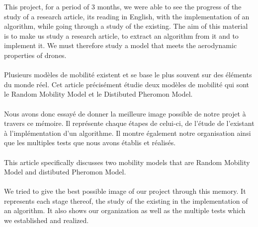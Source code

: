 This project, for a period of 3 months, we were able to see the progress of the study of a research article, its reading in English, with the implementation of an algorithm, while going through a study of the existing.
The aim of this material is to make us study a research article, to extract an algorithm from it and to implement it.
We must therefore study a model that meets the aerodynamic properties of drones.
\\\\
Plusieurs modèles de mobilité existent et se base le plus souvent sur des éléments du monde réel.
Cet article précisément étudie deux modèles de mobilité qui sont le Random Mobility Model et le Distibuted Pheromon Model.\\\\
Nous avons donc essayé de donner la meilleure image possible de notre projet à travers ce mémoire. Il représente chaque étapes de celui-ci, de l'étude de l'existant à l'implémentation d'un algorithme. Il montre également notre organisation ainsi que les multiples tests que nous avons établis et réalisés.
\\\\
This article specifically discusses two mobility models that are Random Mobility Model and distibuted Pheromon Model.\\\\
We tried to give the best possible image of our project through this memory. It represents each stage thereof, the study of the existing in the implementation of an algorithm. It also shows our organization as well as the multiple tests which we established and realized. 
